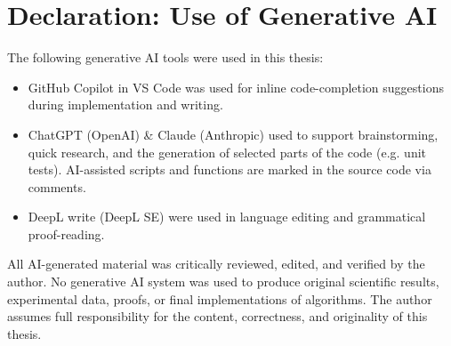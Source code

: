 \documentclass{article}
\begin{document}
\newpage

\printbibliography[title=References, heading=bibintoc]

\clearpage
{}
{}
\section*{Declaration: Use of Generative AI}

The following generative AI tools were used in this thesis:

\begin{itemize}
  \item GitHub Copilot in VS Code was used for inline code-completion suggestions during implementation and writing.
  \item ChatGPT (OpenAI) \& Claude (Anthropic) used to support brainstorming, quick research, and the generation of selected parts of the code (e.g. unit tests). AI-assisted scripts and functions are marked in the source code via comments.
  \item DeepL write (DeepL SE) were used in language editing and grammatical proof-reading.
\end{itemize}

All AI-generated material was critically reviewed, edited, and verified by the author. No generative AI system was used to produce original scientific results, experimental data, proofs, or final implementations of algorithms. The author assumes full responsibility for the content, correctness, and originality of this thesis.

\clearpage
{}
{}

\end{document}
